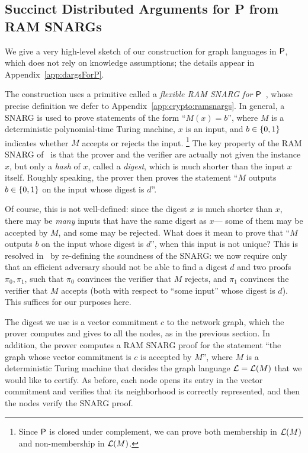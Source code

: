 \subsection{Succinct Distributed Arguments for P from RAM SNARGs}\label{sec:dargsForP}
We give a very high-level sketch of our construction for graph languages in ${\mathsf{P}}$,
which does not rely on knowledge assumptions; the details appear in Appendix~\ref{app:dargsForP}.

The construction uses a primitive called a \emph{flexible RAM SNARG for ${\mathsf{P}}$}~\cite{KP16,cryptoeprint:2022/1320},
whose precise definition we defer to Appendix~\ref{app:crypto:ramsnargs}.
In general, a %
SNARG is used to prove statements of the form ``$M(x) = b$'',
where $M$ is a deterministic polynomial-time Turing machine, $x$ is an input,
and $b \in \left \{{0,1} \right \}$ indicates whether $M$ accepts or rejects the input.%
\footnote{Since ${\mathsf{P}}$ is closed under complement, we can prove both membership in $\mathcal{L}(M)$
and non-membership in $\mathcal{L}(M)$.}
The key property of the RAM SNARG of~\cite{KP16,cryptoeprint:2022/1320} is that 
the prover and the verifier
are actually not given the instance $x$,
but only a \emph{hash} of $x$, called a \emph{digest},
which is much shorter than the input $x$ itself.
Roughly speaking, the prover then proves the statement ``$M$ outputs $b \in \left \{{0,1} \right \}$
on the input whose digest is $d$''.

Of course, this is not well-defined: since the digest $x$ is much shorter than $x$,
there may be \emph{many} inputs that have the same digest as $x$---%
some of them may be accepted by $M$, and some may be rejected.
What does it mean to prove that ``$M$ outputs $b$ on the input whose digest is $d$'',
when this input is not unique?
This is resolved in~\cite{KP16} by re-defining
the soundness of the SNARG:
we now require only that 
an
efficient adversary should not be able to find a digest $d$ and two proofs $\pi_0, \pi_1$,
such that $\pi_0$ convinces the verifier that $M$ rejects,
and $\pi_1$ convinces the verifier that $M$ accepts (both with respect to ``some input'' whose digest is $d$).
This suffices for our purposes here.

The digest we use is a vector commitment $c$ to the network graph, which the prover
computes and gives to all the nodes, as in the previous section.
In addition, the prover computes a RAM SNARG proof for the statement ``the graph whose vector commitment
is $c$ is accepted by $M$'', where $M$ is a deterministic Turing machine that decides
the graph language $\mathcal{L} = \mathcal{L}(M)$ that we would like to certify.
As before, each node opens its entry in the vector commitment and verifies that its neighborhood
is correctly represented, and then the nodes verify the SNARG proof.

